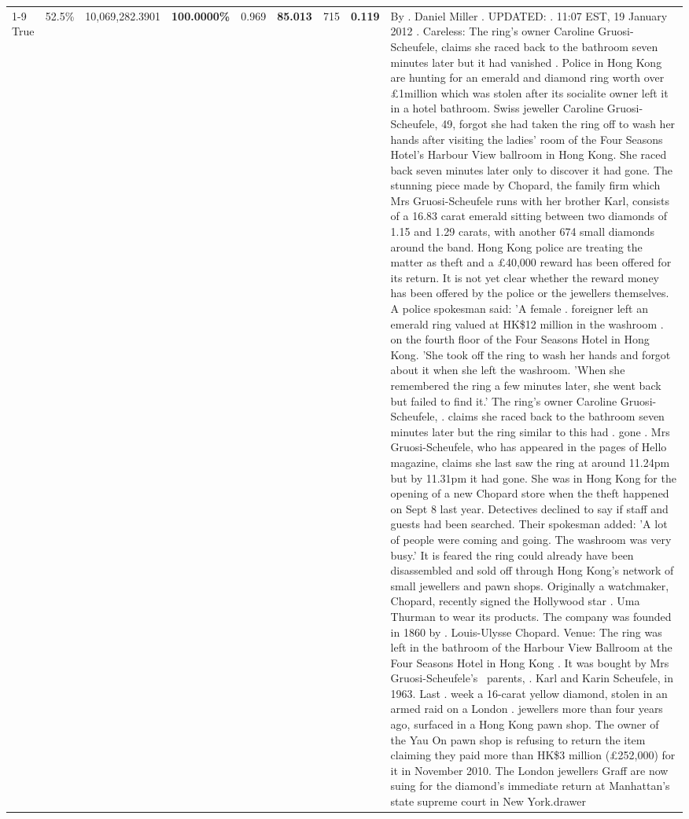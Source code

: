 \begin{table}[H]
\begin{tabular}{lllrlllll}
\cline{1-9} \cline{2-9}
True & 52.5\% & 10,069,282.3901 & \bfseries \color{red} 100.0000\% & 0.969 & \bfseries \color{red} 85.013 & 715 & \bfseries \color{red} 0.119 & By . Daniel Miller . UPDATED: . 11:07 EST, 19 January 2012 . Careless: The ring's owner Caroline Gruosi-Scheufele, claims she raced back to the bathroom seven minutes later but it had vanished . Police in Hong Kong are hunting for an emerald and diamond ring worth over £1million which was stolen after its socialite owner left it in a hotel bathroom. Swiss jeweller Caroline Gruosi-Scheufele, 49, forgot she had taken the ring off to wash her hands after visiting the ladies' room of the Four Seasons Hotel's Harbour View ballroom in Hong Kong. She raced back seven minutes later only to discover it had gone. The stunning piece made by Chopard, the family firm which Mrs Gruosi-Scheufele runs with her brother Karl, consists of a 16.83 carat emerald sitting between two diamonds of 1.15 and 1.29 carats, with another 674 small diamonds around the band. Hong Kong police are treating the matter as theft and a £40,000 reward has been offered for its return. It is not yet clear whether the reward money has been offered by the police or the jewellers themselves. A police spokesman said: 'A female . foreigner left an emerald ring valued at HK\$12 million in the washroom . on the fourth floor of the Four Seasons Hotel in Hong Kong. 'She took off the ring to wash her hands and forgot about it when she left the washroom. 'When she remembered the ring a few minutes later, she went back but failed to find it.' The ring's owner Caroline Gruosi-Scheufele, . claims she raced back to the bathroom seven minutes later but the ring similar to this had . gone . Mrs Gruosi-Scheufele, who has appeared in the pages of Hello magazine, claims she last saw the ring at around 11.24pm but by 11.31pm it had gone. She was in Hong Kong for the opening of a new Chopard store when the theft happened on Sept 8 last year. Detectives declined to say if staff and guests had been searched. Their spokesman added: 'A lot of people were coming and going. The washroom was very busy.' It is feared the ring could already have been disassembled and sold off through Hong Kong's network of small jewellers and pawn shops. Originally a watchmaker, Chopard, recently signed the Hollywood star . Uma Thurman to wear its products. The company was founded in 1860 by . Louis-Ulysse Chopard. Venue: The ring was left in the bathroom of the Harbour View Ballroom at the Four Seasons Hotel in Hong Kong . It was bought by Mrs Gruosi-Scheufele's  parents, . Karl and Karin Scheufele, in 1963. Last . week a 16-carat yellow diamond, stolen in an armed raid on a London . jewellers more than four years ago, surfaced in a Hong Kong pawn shop. The owner of the Yau On pawn shop is refusing to return the item claiming they paid more than HK\$3 million (£252,000) for it in November 2010. The London jewellers Graff are now suing for the diamond’s immediate return at Manhattan’s state supreme court in New York.drawer \\

\end{tabular}
\end{table}
